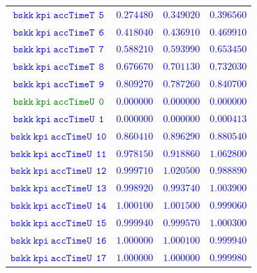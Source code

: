 \documentclass[10pt,a4paper]{article}
\begin{document}
\begin{table}[h!]
{\begin{tabular}{cccc}
\textcolor{blue}{$\mathtt{bskk~kpi~accTimeT~~5}$} & \textcolor{blue}{$0.274480$}& \textcolor{blue}{$0.349020$}& \textcolor{blue}{$0.396560$}\\
\textcolor{blue}{$\mathtt{bskk~kpi~accTimeT~~6}$} & \textcolor{blue}{$0.418040$}& \textcolor{blue}{$0.436910$}& \textcolor{blue}{$0.469910$}\\
\textcolor{blue}{$\mathtt{bskk~kpi~accTimeT~~7}$} & \textcolor{blue}{$0.588210$}& \textcolor{blue}{$0.593990$}& \textcolor{blue}{$0.653450$}\\
\textcolor{blue}{$\mathtt{bskk~kpi~accTimeT~~8}$} & \textcolor{blue}{$0.676670$}& \textcolor{blue}{$0.701130$}& \textcolor{blue}{$0.732030$}\\
\textcolor{blue}{$\mathtt{bskk~kpi~accTimeT~~9}$} & \textcolor{blue}{$0.809270$}& \textcolor{blue}{$0.787260$}& \textcolor{blue}{$0.840700$}\\
\textcolor{Green}{$\mathtt{bskk~kpi~accTimeU~~0}$} & \textcolor{blue}{$0.000000$}& \textcolor{blue}{$0.000000$}& \textcolor{blue}{$0.000000$}\\
\textcolor{blue}{$\mathtt{bskk~kpi~accTimeU~~1}$} & \textcolor{blue}{$0.000000$}& \textcolor{blue}{$0.000000$}& \textcolor{blue}{$0.000413$}\\
\textcolor{blue}{$\mathtt{bskk~kpi~accTimeU~~10}$} & \textcolor{blue}{$0.860410$}& \textcolor{blue}{$0.896290$}& \textcolor{blue}{$0.880540$}\\
\textcolor{blue}{$\mathtt{bskk~kpi~accTimeU~~11}$} & \textcolor{blue}{$0.978150$}& \textcolor{blue}{$0.918860$}& \textcolor{blue}{$1.062800$}\\
\textcolor{blue}{$\mathtt{bskk~kpi~accTimeU~~12}$} & \textcolor{blue}{$0.999710$}& \textcolor{blue}{$1.020500$}& \textcolor{blue}{$0.988890$}\\
\textcolor{blue}{$\mathtt{bskk~kpi~accTimeU~~13}$} & \textcolor{blue}{$0.998920$}& \textcolor{blue}{$0.993740$}& \textcolor{blue}{$1.003900$}\\
\textcolor{blue}{$\mathtt{bskk~kpi~accTimeU~~14}$} & \textcolor{blue}{$1.000100$}& \textcolor{blue}{$1.001500$}& \textcolor{blue}{$0.999060$}\\
\textcolor{blue}{$\mathtt{bskk~kpi~accTimeU~~15}$} & \textcolor{blue}{$0.999940$}& \textcolor{blue}{$0.999570$}& \textcolor{blue}{$1.000300$}\\
\textcolor{blue}{$\mathtt{bskk~kpi~accTimeU~~16}$} & \textcolor{blue}{$1.000000$}& \textcolor{blue}{$1.000100$}& \textcolor{blue}{$0.999940$}\\
\textcolor{blue}{$\mathtt{bskk~kpi~accTimeU~~17}$} & \textcolor{blue}{$1.000000$}& \textcolor{blue}{$1.000000$}& \textcolor{blue}{$0.999980$}\\

\end{tabular}}
\end{table}
\end{document}
